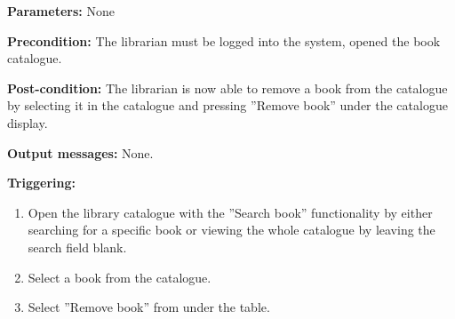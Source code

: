 \begin{description}

\item \textbf{Parameters:} None

\item \textbf{Precondition:} The librarian must be logged into the system,
opened the book catalogue.

\item \textbf{Post-condition:} The librarian is now able to remove a book from
the catalogue by selecting it in the catalogue and pressing ''Remove book''
under the catalogue display.

\item \textbf{Output messages:} None.

\item \textbf{Triggering:}
\begin{enumerate}
\item Open the library catalogue with the ''Search book'' functionality by
either searching for a specific book or viewing the whole catalogue by leaving
the search field blank.
\item Select a book from the catalogue.
\item Select ''Remove book'' from under the table.
\end{enumerate}

\end{description}
